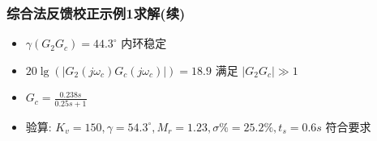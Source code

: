 \documentclass[table]{beamer}
\begin{document}
\begin{frame}
\frametitle{综合法反馈校正示例1求解(续)}
\label{sec-3-8}

\begin{itemize}
\item $\gamma(G_2G_c)=44.3^{\circ}$ 内环稳定
\item $20\lg(|G_2(j\omega_c)G_c(j\omega_c)|)=18.9$ 满足 $|G_2G_c|\gg 1$
\item $G_c=\frac{0.238s}{0.25s+1}$
\item 验算: $K_v=150,\gamma=54.3^{\circ},M_r=1.23,\sigma\%=25.2\%,t_s=0.6s$  符合要求
\end{itemize}
  
\end{frame}
\end{document}
